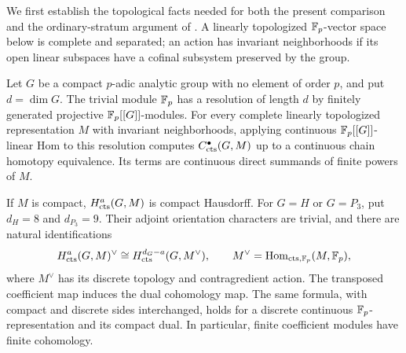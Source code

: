 We first establish the topological facts needed for both the present
comparison and the ordinary-stratum argument of .
A linearly topologized $\mathbb F_p$-vector space below is complete and separated;
an action has invariant neighborhoods if its open linear subspaces have
a cofinal subsystem preserved by the group.

\begin{lemma}
\label{h3:co:compact-resolution}
Let $G$ be a compact $p$-adic analytic group with no element of order
$p$, and put $d=\dim G$.  The trivial module $\mathbb F_p$ has a resolution of
length $d$ by finitely generated projective $\mathbb F_p[[G]]$-modules.
For every complete linearly topologized representation $M$ with invariant
neighborhoods, applying continuous $\mathbb F_p[[G]]$-linear Hom to this
resolution computes $C^\bullet_{\mathrm{cts}}(G,M)$ up to a continuous chain
homotopy equivalence.  Its terms are continuous direct summands of finite
powers of $M$.

If $M$ is compact, $H^a_{\mathrm{cts}}(G,M)$ is compact Hausdorff.
For $G=H$ or $G=P_3$, put $d_H=8$ and $d_{P_3}=9$.  Their
adjoint orientation characters are trivial, and there are natural
identifications
\begin{equation}\label{h3:co:compact-duality}
 H^a_{\mathrm{cts}}(G,M)^\vee
 \cong H^{d_G-a}_{\mathrm{cts}}(G,M^\vee),
 \qquad
 M^\vee=\operatorname{Hom}_{\mathrm{cts},\mathbb F_p}(M,\mathbb F_p),
\end{equation}
where $M^\vee$ has its discrete topology and contragredient action.
The transposed coefficient map induces the dual cohomology map.
The same formula, with compact and discrete sides interchanged, holds
for a discrete continuous $\mathbb F_p$-representation and its compact dual.
In particular, finite coefficient modules have finite cohomology.
\end{lemma}


